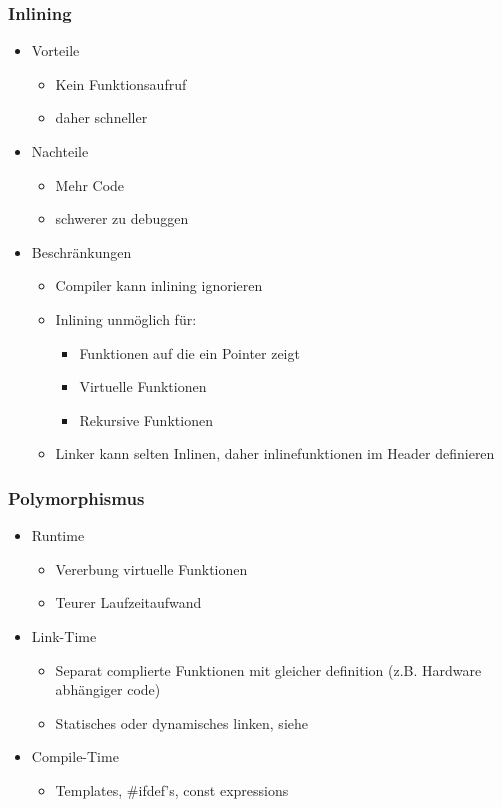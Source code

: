 \subsubsection{Inlining}
\begin{itemize}
	\item Vorteile
		\begin{itemize}
			\item Kein Funktionsaufruf
			\item daher schneller
		\end{itemize}
	\item Nachteile
		\begin{itemize}
			\item Mehr Code
			\item schwerer zu debuggen
		\end{itemize}
	\item Beschränkungen
		\begin{itemize}
			\item Compiler kann inlining ignorieren
			\item Inlining unmöglich für:
				\begin{itemize}
					\item Funktionen auf die ein Pointer zeigt
					\item Virtuelle Funktionen
					\item Rekursive Funktionen
				\end{itemize}
			\item Linker kann selten Inlinen, daher inlinefunktionen im Header definieren
		\end{itemize}
\end{itemize}

\subsubsection{Polymorphismus}
\begin{itemize}
	\item Runtime
		\begin{itemize}
			\item Vererbung virtuelle Funktionen
			\item Teurer Laufzeitaufwand
		\end{itemize}
	\item Link-Time
		\begin{itemize}
			\item Separat complierte Funktionen mit gleicher definition (z.B.
				Hardware abhängiger code)
			\item Statisches oder dynamisches linken, siehe 
		\end{itemize}
	\item Compile-Time
		\begin{itemize}
			\item Templates, \#ifdef's, const expressions
		\end{itemize}
\end{itemize}

